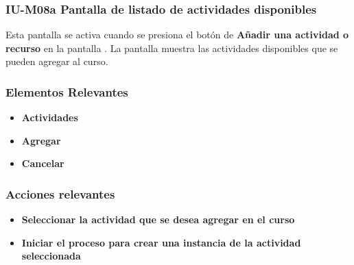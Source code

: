 
\subsubsection{IU-M08a Pantalla de listado de actividades disponibles}

 Esta pantalla se activa cuando se presiona el botón de {\bf Añadir una actividad o recurso} en la pantalla . La pantalla muestra las actividades disponibles que se pueden agregar al curso.


\subsubsection{Elementos Relevantes}

    \begin{itemize}
    \item {\bf Actividades}
    \item {\bf Agregar}
    \item {\bf Cancelar}
    \end{itemize}

\subsubsection{Acciones relevantes}

    \begin{itemize}
    \item {\bf Seleccionar la actividad que se desea agregar en el curso}
    \item {\bf Iniciar el proceso para crear una instancia de la actividad seleccionada}
    \end{itemize}

\clearpage
